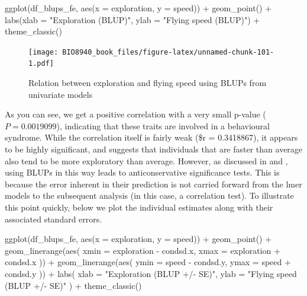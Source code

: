 \documentclass[
  12pt,
]{book}
\newenvironment{Shaded}{\begin{snugshade}}{\end{snugshade}}
\newcommand{\AttributeTok}[1]{\textcolor[rgb]{0.77,0.63,0.00}{#1}}
\newcommand{\FunctionTok}[1]{\textcolor[rgb]{0.00,0.00,0.00}{#1}}
\newcommand{\NormalTok}[1]{#1}
\newcommand{\SpecialCharTok}[1]{\textcolor[rgb]{0.00,0.00,0.00}{#1}}
\newcommand{\StringTok}[1]{\textcolor[rgb]{0.31,0.60,0.02}{#1}}
\begin{document}
\begin{Shaded}
\begin{Highlighting}[]
\FunctionTok{ggplot}\NormalTok{(df\_blups\_fe, }\FunctionTok{aes}\NormalTok{(}\AttributeTok{x =}\NormalTok{ exploration, }\AttributeTok{y =}\NormalTok{ speed)) }\SpecialCharTok{+}
  \FunctionTok{geom\_point}\NormalTok{() }\SpecialCharTok{+}
  \FunctionTok{labs}\NormalTok{(}\AttributeTok{xlab =} \StringTok{"Exploration (BLUP)"}\NormalTok{, }\AttributeTok{ylab =} \StringTok{"Flying speed (BLUP)"}\NormalTok{) }\SpecialCharTok{+}
  \FunctionTok{theme\_classic}\NormalTok{()}
\end{Highlighting}
\end{Shaded}

\begin{figure}
\centering
\texttt{[image: BIO8940\_book\_files/figure-latex/unnamed-chunk-101-1.pdf]}
\caption{\label{fig:unnamed-chunk-101}Relation between exploration and flying speed using BLUPs from univariate models}
\end{figure}

As you can see, we get a positive correlation with a very small p-value (\(P = 0.0019099\)), indicating that these traits are involved in a behavioural syndrome. While the correlation itself is fairly weak (\$r = 0.3418867), it appears to be highly significant, and suggests that individuals that are faster than average also tend to be more exploratory than average.
However, as discussed in \citet{hadfield_misuse_2010} and \citet{houslay_avoiding_2017}, using BLUPs in this way leads to anticonservative significance tests. This is because the error inherent in their prediction is not carried forward from the lmer models to the subsequent analysis (in this case, a correlation test).
To illustrate this point quickly, below we plot the individual estimates along with their associated standard errors.

\begin{Shaded}
\begin{Highlighting}[]
\FunctionTok{ggplot}\NormalTok{(df\_blups\_fe, }\FunctionTok{aes}\NormalTok{(}\AttributeTok{x =}\NormalTok{ exploration, }\AttributeTok{y =}\NormalTok{ speed)) }\SpecialCharTok{+}
  \FunctionTok{geom\_point}\NormalTok{() }\SpecialCharTok{+}
  \FunctionTok{geom\_linerange}\NormalTok{(}\FunctionTok{aes}\NormalTok{(}
    \AttributeTok{xmin =}\NormalTok{ exploration }\SpecialCharTok{{-}}\NormalTok{ condsd.x,}
    \AttributeTok{xmax =}\NormalTok{ exploration }\SpecialCharTok{+}\NormalTok{ condsd.x}
\NormalTok{  )) }\SpecialCharTok{+}
  \FunctionTok{geom\_linerange}\NormalTok{(}\FunctionTok{aes}\NormalTok{(}
    \AttributeTok{ymin =}\NormalTok{ speed }\SpecialCharTok{{-}}\NormalTok{ condsd.y,}
    \AttributeTok{ymax =}\NormalTok{ speed }\SpecialCharTok{+}\NormalTok{ condsd.y}
\NormalTok{  )) }\SpecialCharTok{+}
  \FunctionTok{labs}\NormalTok{(}
    \AttributeTok{xlab =} \StringTok{"Exploration (BLUP +/{-} SE)"}\NormalTok{,}
    \AttributeTok{ylab =} \StringTok{"Flying speed (BLUP +/{-} SE)"}
\NormalTok{  ) }\SpecialCharTok{+}
  \FunctionTok{theme\_classic}\NormalTok{()}
\end{Highlighting}
\end{Shaded}
\end{document}

